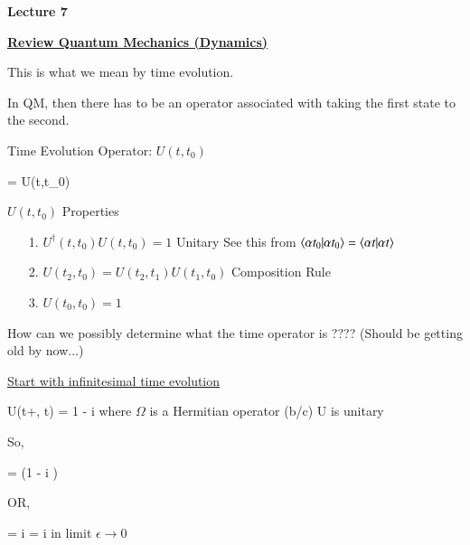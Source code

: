 
\usepackage{fancyhdr}

\fancyhf{}


\thispagestyle{fancy}

\begin{center}
{\huge \textbf{Lecture 7}}
\end{center}

{\fontsize{14}{16}\selectfont

\textbf{\underline{Review Quantum Mechanics (Dynamics)}}

\be
{} \rightarrow {}
\ee

This is what we mean by time evolution.  

In QM, then there has to be an operator associated with taking the first state to the second. 

Time Evolution Operator:  $U(t,t_0)$


\be
{} = U(t,t_0) 
\ee

$U(t,t_0)$ Properties
\begin{itemize}
\item[1.] $U^\dagger(t,t_0)U(t,t_0) = 1$ Unitary  See this from $\braket{\alpha t_0|\alpha t_0} = \braket{\alpha t|\alpha t}$
\item[2.] $U(t_2, t_0) = U(t_2,t_1)U(t_1,t_0)$ Composition Rule
\item[3.] $U(t_0, t_0) = 1$
\end{itemize}


How can we possibly determine what the time operator is ????
(Should be getting old by now...)


\underline{Start with infinitesimal time evolution}

\be
U(t+\epsilon, t)  = 1 - i\Omega \epsilon
\ee
where $\Omega$ is a Hermitian operator (b/c) U is unitary


So, 

\be
{} = (1 - i \epsilon \Omega ) 
\ee

OR,

\be
\Omega {} = i  = i  
\ee
in limit $\epsilon \rightarrow 0$


}
